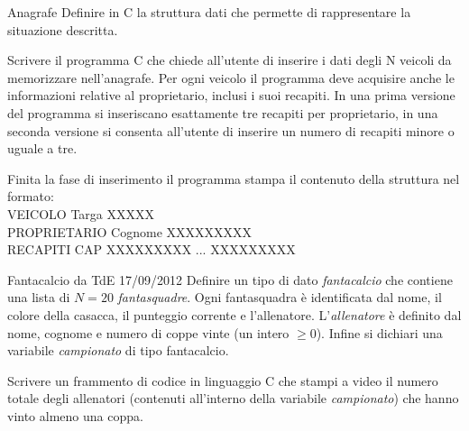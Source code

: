 \documentclass[format=169, handout]{beamer}
\begin{document}
{
\small
\begin{frame}{Anagrafe}
Definire in C la struttura dati che permette di rappresentare la situazione descritta.

Scrivere il programma C che chiede all’utente di inserire i dati degli N veicoli da memorizzare
nell’anagrafe. Per ogni veicolo il programma deve acquisire anche le informazioni relative al
proprietario, inclusi i suoi recapiti. In una prima versione del programma si inseriscano esattamente
tre recapiti per proprietario, in una seconda versione si consenta all’utente di inserire un numero di
recapiti minore o uguale a tre.

Finita la fase di inserimento il programma stampa il contenuto della struttura nel formato:\\
VEICOLO Targa XXXXX \\
PROPRIETARIO Cognome XXXXXXXXX \\
RECAPITI CAP XXXXXXXXX ... XXXXXXXXX \\
\end{frame}
}



\begin{frame}{Fantacalcio da TdE 17/09/2012}
Definire un tipo di dato \emph{fantacalcio} che contiene una lista di $N = 20$ \emph{fantasquadre}. Ogni fantasquadra è identificata dal nome, il colore della casacca, il punteggio corrente e l’allenatore. L’\emph{allenatore} è definito dal nome, cognome e numero di coppe vinte (un intero $\geq 0$). Infine si dichiari una variabile \emph{campionato} di
tipo fantacalcio. 

Scrivere un frammento di codice in linguaggio C che stampi a video il numero totale degli allenatori (contenuti all'interno della variabile \emph{campionato}) che hanno vinto almeno una coppa.
\end{frame}
\end{document}
